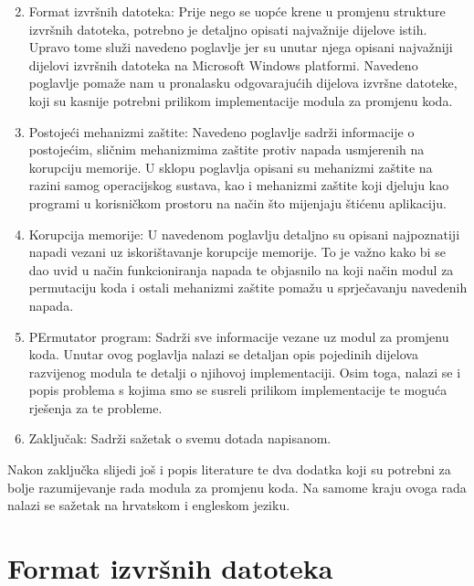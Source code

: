 \documentclass[times, utf8, diplomski, numeric]{fer}
\begin{document}
\begin{enumerate}							%
\setcounter{enumi}{1}

\item Format izvršnih datoteka: Prije nego se uopće krene u
promjenu strukture izvršnih datoteka, potrebno je detaljno
opisati najvažnije dijelove istih.  Upravo tome služi navedeno
poglavlje jer su unutar njega opisani najvažniji dijelovi
izvršnih datoteka na Microsoft Windows platformi. Navedeno
poglavlje pomaže nam u pronalasku odgovarajućih dijelova izvršne
datoteke, koji su kasnije potrebni prilikom implementacije modula
za promjenu koda.

\item Postojeći mehanizmi zaštite: Navedeno poglavlje sadrži
informacije o postojećim, sličnim mehanizmima zaštite protiv
napada usmjerenih na korupciju memorije. U sklopu poglavlja
opisani su mehanizmi zaštite na razini samog operacijskog
sustava, kao i mehanizmi zaštite koji djeluju kao programi u
korisničkom prostoru na način što mijenjaju štićenu aplikaciju.

\item Korupcija memorije: U navedenom poglavlju detaljno su
opisani najpoznatiji napadi vezani uz iskorištavanje korupcije
memorije.  To je važno kako bi se dao 
uvid u način funkcioniranja napada te objasnilo na koji
način modul za permutaciju koda i ostali mehanizmi zaštite pomažu
u sprječavanju navedenih napada.

\item PErmutator program: Sadrži sve informacije vezane uz modul
za promjenu koda. Unutar ovog poglavlja nalazi se detaljan opis
pojedinih dijelova razvijenog modula te detalji o njihovoj
implementaciji. Osim toga, nalazi se i popis problema s kojima
smo se susreli prilikom implementacije te moguća rješenja za te
probleme.

\item Zaključak: Sadrži sažetak o svemu dotada napisanom.			%
\end{enumerate}

Nakon zaključka slijedi još i popis literature te dva dodatka
koji su potrebni za bolje razumijevanje rada modula za promjenu
koda. Na samome kraju ovoga rada nalazi se sažetak na hrvatskom i
engleskom jeziku.

\chapter{Format izvršnih datoteka}
\label{sct:peFormat}
\end{document}
